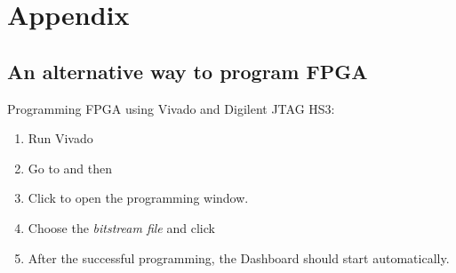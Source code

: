 \documentclass[12pt,oneside,a4]{article}
\begin{document}
\section{Appendix}
\subsection{An alternative way to program FPGA}
Programming FPGA using Vivado and Digilent JTAG HS3:
\begin{enumerate}
		\item Run Vivado
		\item Go to  and then  
		\item Click  to open the programming window. 
		\item Choose the \textit{bitstream file} and click 

	\item After the successful programming, the Dashboard should start automatically.
\end{enumerate}
\begin{thebibliography}{99}
\end{thebibliography}
\end{document}
